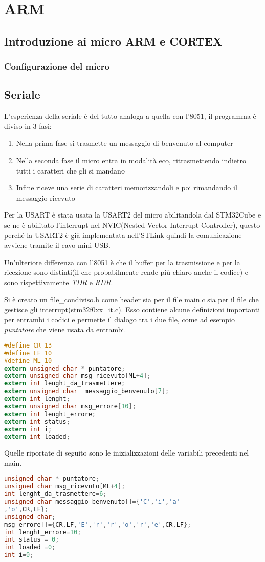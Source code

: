 \documentclass[main.tex]{subfiles}
\begin{document}
\chapter{ARM}
\section{Introduzione ai micro ARM e CORTEX}
\subsection{Configurazione del micro}

\section{Seriale}
L'esperienza della seriale è del tutto analoga a quella con l'8051, il programma è diviso in 3 fasi:\begin{enumerate}
    \item Nella prima fase si trasmette un messaggio di benvenuto al computer
    \item Nella seconda fase il micro entra in modalità eco, ritrasmettendo indietro tutti i caratteri che gli si mandano
    \item Infine riceve una serie di caratteri memorizzandoli e poi rimandando il messaggio ricevuto
\end{enumerate}
Per la USART è stata usata la USART2 del micro abilitandola dal STM32Cube e se ne è abilitato l'interrupt nel NVIC(Nested Vector Interrupt Controller), questo perché la USART2 è già implementata nell'STLink quindi la comunicazione avviene tramite il cavo mini-USB. 

Un'ulteriore differenza con l'8051 è che il buffer per la trasmissione e per la ricezione sono distinti(il che probabilmente rende più chiaro anche il codice) e sono rispettivamente \textit{TDR} e \textit{RDR}. 

Si è creato un file\_condiviso.h come header sia per il file main.c sia per il file che gestisce gli interrupt(stm32f0xx\_it.c). Esso contiene alcune definizioni importanti per entrambi i codici e permette il dialogo tra i due file, come ad esempio \textit{puntatore} che viene usata da entrambi.
\begin{lstlisting}[language=C,caption=Header dei files]
#define CR 13
#define LF 10
#define ML 10
extern unsigned char * puntatore;
extern unsigned char msg_ricevuto[ML+4];
extern int lenght_da_trasmettere;
extern unsigned char  messaggio_benvenuto[7];
extern int lenght;
extern unsigned char msg_errore[10];
extern int lenght_errore;
extern int status;
extern int i;
extern int loaded;
\end{lstlisting}
Quelle riportate di seguito sono le inizializzazioni delle variabili precedenti nel main.
\begin{lstlisting}[language=c,caption=Inizializzazione variabili]
unsigned char * puntatore;
unsigned char msg_ricevuto[ML+4];
int lenght_da_trasmettere=6;
unsigned char messaggio_benvenuto[]={'C','i','a'
,'o',CR,LF};
unsigned char;
msg_errore[]={CR,LF,'E','r','r','o','r','e',CR,LF};
int lenght_errore=10;
int status = 0;
int loaded =0;
int i=0;
\end{lstlisting}
\end{document}
